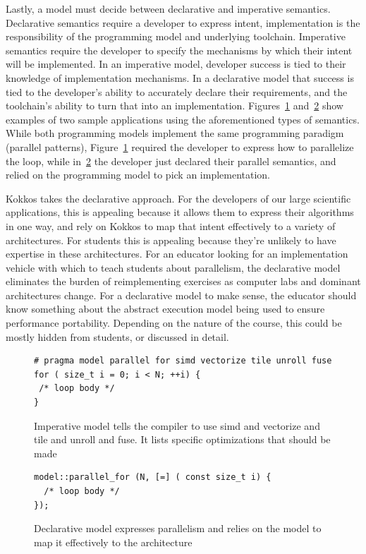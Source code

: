 Lastly, a model must decide between declarative and imperative semantics. Declarative semantics require a developer to express intent, implementation is the responsibility of the programming model and underlying toolchain. Imperative semantics require the developer to specify the mechanisms by which their intent will be implemented. In an imperative model, developer success is tied to their knowledge of implementation mechanisms. In a declarative model that success is tied to the developer's ability to accurately declare their requirements, and the toolchain's ability to turn that into an implementation. Figures~\ref{figOMPLike} and~\ref{figKokkosLike} show examples of two sample applications using the aforementioned types of semantics. While both programming models implement the same programming paradigm (parallel patterns), Figure~\ref{figOMPLike} required the developer to express how to parallelize the loop, while in~\ref{figKokkosLike} the developer just declared their parallel semantics, and relied on the programming model to pick an implementation. 

Kokkos takes the declarative approach. For the developers of our large scientific applications, this is appealing because it allows them to express their algorithms in one way, and rely on Kokkos to map that intent effectively to a variety of architectures. For students this is appealing because they're unlikely to have expertise in these architectures. For an educator looking for an implementation vehicle with which to teach students about parallelism, the declarative model eliminates the burden of reimplementing exercises as computer labs and dominant architectures change. For a declarative model to make sense, the educator should know something about the abstract execution model being used to ensure performance portability. Depending on the nature of the course, this could be mostly hidden from students, or discussed in detail.

\begin{figure}
\begin{Verbatim}[frame=leftline]
# pragma model parallel for simd vectorize tile unroll fuse
for ( size_t i = 0; i < N; ++i) {
 /* loop body */
}
\end{Verbatim}
\caption{Imperative model tells the compiler to use simd and vectorize and tile and unroll and fuse. It lists specific optimizations that should be made}
\label{figOMPLike}
\end{figure}

\begin{figure}
\begin{Verbatim}[frame=leftline]
model::parallel_for (N, [=] ( const size_t i) {
  /* loop body */
});
\end{Verbatim}
\caption{Declarative model expresses parallelism and relies on the model to map it effectively to the architecture}
\label{figKokkosLike}
\end{figure}
